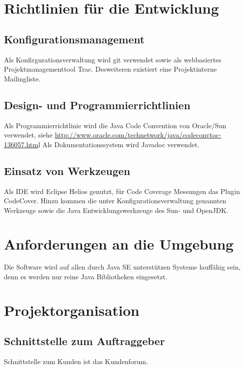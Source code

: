 \documentclass[a4paper,10pt]{scrartcl}
\begin{document}
\section{Richtlinien für die Entwicklung}
\subsection{Konfigurationsmanagement}
Als Konfirgurationsverwaltung wird git verwendet sowie als webbasiertes Projektmanagementtool Trac. Desweiteren existiert eine Projektinterne Mailingliste.
\subsection{Design- und Programmierrichtlinien}
Als Programmierrichtlinie wird die Java Code Convention von Oracle/Sun verwendet, siehe \url{http://www.oracle.com/technetwork/java/codeconvtoc-136057.htm}l
Als Dokumentationssystem wird Javadoc verwendet.
\subsection{Einsatz von Werkzeugen}
Als IDE wird Eclipse Helios genutzt, für Code Coverage Messungen das Plugin CodeCover. Hinzu kommen die unter Konfigurationsverwaltung genannten Werkzeuge sowie die Java Entwicklungswerkzeuge des Sun- und OpenJDK.
\section{Anforderungen an die Umgebung}
Die Software wird auf allen durch Java SE unterstützen Systeme lauffähig sein, denn es werden nur reine Java Bibliotheken eingesetzt.

\section{Projektorganisation}
\subsection{Schnittstelle zum Auftraggeber}
Schnittstelle zum Kunden ist das Kundenforum. 
\end{document}
